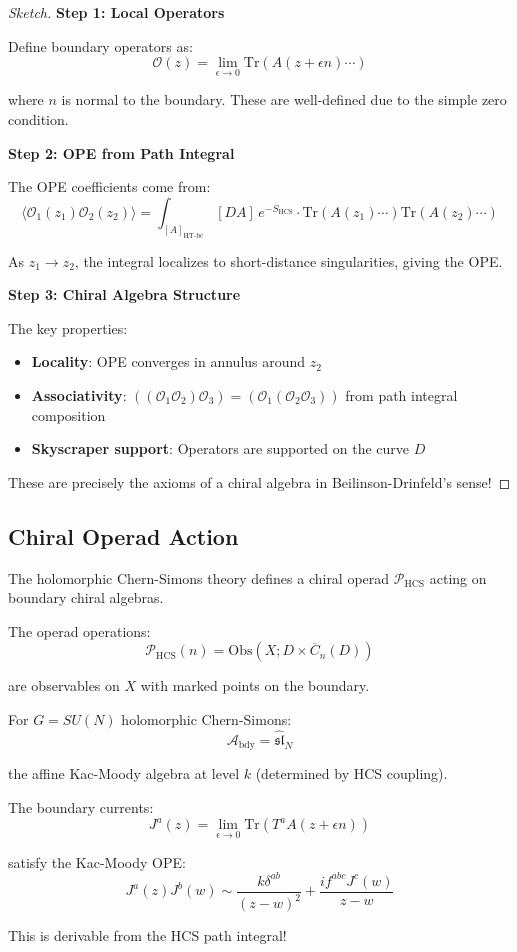 \begin{proof}[Sketch]
\textbf{Step 1: Local Operators}

Define boundary operators as:
$$\mathcal{O}(z) = \lim_{\epsilon \to 0} \text{Tr}(A(z + \epsilon n) \cdots)$$

where $n$ is normal to the boundary. These are well-defined due to the simple 
zero condition.

\textbf{Step 2: OPE from Path Integral}

The OPE coefficients come from:
$$\langle \mathcal{O}_1(z_1) \mathcal{O}_2(z_2) \rangle = 
\int_{[A]_{\text{HT-bc}}} [DA] \, e^{-S_{\text{HCS}}} \cdot 
\text{Tr}(A(z_1) \cdots) \text{Tr}(A(z_2) \cdots)$$

As $z_1 \to z_2$, the integral localizes to short-distance singularities, 
giving the OPE.

\textbf{Step 3: Chiral Algebra Structure}

The key properties:
\begin{itemize}
\item \textbf{Locality}: OPE converges in annulus around $z_2$
\item \textbf{Associativity}: $((\mathcal{O}_1 \mathcal{O}_2) \mathcal{O}_3) = 
(\mathcal{O}_1 (\mathcal{O}_2 \mathcal{O}_3))$ from path integral composition
\item \textbf{Skyscraper support}: Operators are supported on the curve $D$
\end{itemize}

These are precisely the axioms of a chiral algebra in Beilinson-Drinfeld's sense!
\end{proof}

\subsection{Chiral Operad Action}

\begin{theorem}
The holomorphic Chern-Simons theory defines a chiral operad $\mathcal{P}_{\text{HCS}}$ 
acting on boundary chiral algebras.

The operad operations:
$$\mathcal{P}_{\text{HCS}}(n) = \text{Obs}(X; D \times \overline{C}_n(D))$$

are observables on $X$ with marked points on the boundary.
\end{theorem}

\begin{example}
For $G = SU(N)$ holomorphic Chern-Simons:
$$\mathcal{A}_{\text{bdy}} = \widehat{\mathfrak{sl}}_N$$

the affine Kac-Moody algebra at level $k$ (determined by HCS coupling).

The boundary currents:
$$J^a(z) = \lim_{\epsilon \to 0} \text{Tr}(T^a A(z + \epsilon n))$$

satisfy the Kac-Moody OPE:
$$J^a(z) J^b(w) \sim \frac{k \delta^{ab}}{(z-w)^2} + 
\frac{if^{abc} J^c(w)}{z-w}$$

This is derivable from the HCS path integral!
\end{example}

